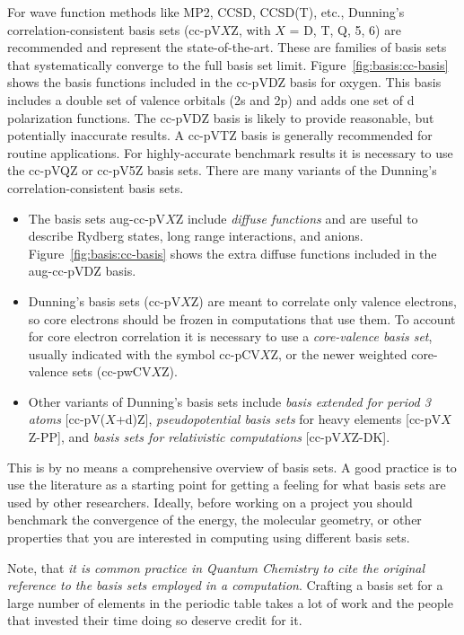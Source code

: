 \documentclass[../Main/chem371-notes.tex]{subfiles}
\begin{document}
For wave function methods like MP2, CCSD, CCSD(T), etc., Dunning's  correlation-consistent basis sets (cc-pV$X$Z, with $X$ = D, T, Q, 5, 6) are recommended and represent the state-of-the-art.
These are families of basis sets that systematically converge to the full basis set limit.
Figure~\ref{fig:basis:cc-basis} shows the basis functions included in the cc-pVDZ basis for oxygen.
This basis includes a double set of valence orbitals (2s and 2p) and adds one set of d polarization functions.
The cc-pVDZ basis is likely to provide reasonable, but potentially inaccurate results. A cc-pVTZ basis is generally recommended for routine applications. 
For highly-accurate benchmark results it is necessary to use the cc-pVQZ or cc-pV5Z basis sets.
There are many variants of the Dunning's  correlation-consistent basis sets.
\begin{itemize}
\item The basis sets aug-cc-pV$X$Z include \emph{diffuse functions} and are useful to describe Rydberg states, long range interactions, and anions.
Figure~\ref{fig:basis:cc-basis} shows the extra diffuse functions included in the aug-cc-pVDZ basis.

\item Dunning's basis sets (cc-pV$X$Z) are meant to correlate only valence electrons, so core electrons should be frozen in computations that use them.
To account for core electron correlation it is necessary to use a \emph{core-valence basis set}, usually indicated with the symbol cc-pCV$X$Z, or the newer weighted core-valence sets (cc-pwCV$X$Z). 

\item Other variants of Dunning's basis sets include \emph{basis extended for period 3 atoms} [cc-pV($X$+d)Z], \emph{pseudopotential basis sets} for heavy elements [cc-pV$X$Z-PP], and \emph{basis sets for relativistic computations} [cc-pV$X$Z-DK].
\end{itemize}

This is by no means a comprehensive overview of basis sets.
A good practice is to use the literature as a starting point for getting a feeling for what basis sets are used by other researchers.
Ideally, before working on a project you should benchmark the convergence of the energy, the molecular geometry, or other properties that you are interested in computing using different basis sets.

Note, that \emph{it is common practice in Quantum Chemistry to cite the original reference to the basis sets employed in a computation}. Crafting a basis set for a large number of elements in the periodic table takes a lot of work and the people that invested their time doing so deserve credit for it.
\end{document}

